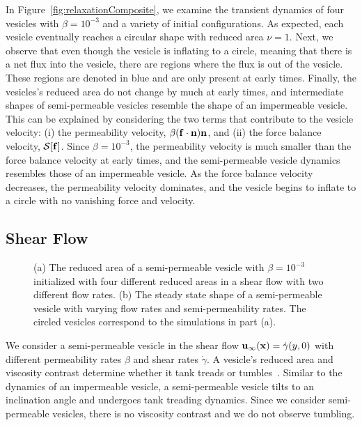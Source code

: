 \documentclass[9pt,twocolumn,twoside,lineno]{pnas-new}
\newif\ifTikz
\begin{document}
In Figure~\ref{fig:relaxationComposite}, we examine the transient
dynamics of four vesicles with $\beta = 10^{-3}$ and a variety of
initial configurations. As expected, each vesicle eventually
reaches a circular shape with reduced area $\nu=1$. Next, we observe
that even though the vesicle is inflating to a circle, meaning that
there is a net flux into the vesicle, there are regions where the flux
is out of the vesicle. These regions are denoted in blue and are only
present at early times. Finally, the vesicles's reduced area do not 
change by much at early times, and intermediate shapes of semi-permeable vesicles
resemble the shape of an impermeable vesicle. This can be explained by
considering the two terms that contribute to the vesicle velocity: (i)
the permeability velocity, $\beta(\mathbf{f} \cdot \mathbf{n}) \mathbf{n}$, and (ii) the
force balance velocity, $\mathcal{S}[\mathbf{f}]$. Since $\beta = 10^{-3}$, the
permeability velocity is much smaller than the force balance velocity at
early times, and the semi-permeable vesicle dynamics resembles those of
an impermeable vesicle. As the force balance velocity decreases, the
permeability velocity dominates, and the vesicle begins to inflate to a
circle with no vanishing force and velocity. 





\subsection*{Shear Flow}
\begin{figure}[htp]
  \centering
  \ifTikz
  
  \fi
  \caption{\label{fig:shearComposite} (a) The reduced area of a
  semi-permeable vesicle with $\beta = 10^{-3}$ initialized with four
  different reduced areas in a shear flow with two different flow rates.
  (b) The steady state shape of a semi-permeable vesicle with varying
  flow rates and semi-permeability rates. The circled vesicles
  correspond to the simulations in part (a).}
\end{figure}

We consider a semi-permeable vesicle in the shear flow
$\mathbf{u}_{\infty}(\mathbf{x}) = \dot{\gamma} (y,0)$ with different permeability
rates $\beta$ and shear rates $\dot{\gamma}$. A vesicle's reduced area
and viscosity contrast determine whether it tank treads or
tumbles~\cite{fin-lam-sei-gom2008, kra-win-sei-lip1996}. Similar to the
dynamics of an impermeable vesicle, a semi-permeable vesicle tilts to an
inclination angle and undergoes tank treading dynamics. Since we
consider semi-permeable vesicles, there is no viscosity contrast and
we do not observe tumbling. 
\end{document}
